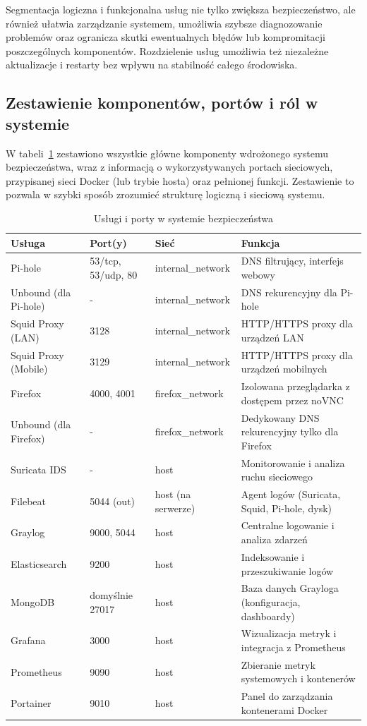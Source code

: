 \documentclass[
    left=2.5cm,         %
    right=2.5cm,        %
    top=2.5cm,          %
    bottom=3cm,         %
    bindingoffset=6mm,  %
    nohyphenation=true %
]{eiti/eiti-thesis} %
\begin{document}
Segmentacja logiczna i funkcjonalna usług nie tylko zwiększa bezpieczeństwo, ale również ułatwia zarządzanie systemem, umożliwia szybsze diagnozowanie problemów oraz ogranicza skutki ewentualnych błędów lub kompromitacji poszczególnych komponentów. Rozdzielenie usług umożliwia też niezależne aktualizacje i restarty bez wpływu na stabilność całego środowiska.

\subsection{Zestawienie komponentów, portów i ról w systemie}

W tabeli~\ref{tab:services-overview} zestawiono wszystkie główne komponenty wdrożonego systemu bezpieczeństwa, wraz z informacją o wykorzystywanych portach sieciowych, przypisanej sieci Docker (lub trybie hosta) oraz pełnionej funkcji. Zestawienie to pozwala w szybki sposób zrozumieć strukturę logiczną i sieciową systemu.

\newpage
\begin{table}[H]
\centering
\caption{Usługi i porty w systemie bezpieczeństwa}
\label{tab:services-overview}
\begin{tabularx}{\textwidth}{|l|l|l|X|}
\hline
\textbf{Usługa} & \textbf{Port(y)} & \textbf{Sieć} & \textbf{Funkcja} \\
\hline
Pi-hole & 53/tcp, 53/udp, 80 & internal\_network & DNS filtrujący, interfejs webowy \\
\hline
Unbound (dla Pi-hole) & - & internal\_network & DNS rekurencyjny dla Pi-hole \\
\hline
Squid Proxy (LAN) & 3128 & internal\_network & HTTP/HTTPS proxy dla urządzeń LAN \\
\hline
Squid Proxy (Mobile) & 3129 & internal\_network & HTTP/HTTPS proxy dla urządzeń mobilnych \\
\hline
Firefox & 4000, 4001 & firefox\_network & Izolowana przeglądarka z dostępem przez noVNC \\
\hline
Unbound (dla Firefox) & - & firefox\_network & Dedykowany DNS rekurencyjny tylko dla Firefox \\
\hline
Suricata IDS & - & host & Monitorowanie i analiza ruchu sieciowego \\
\hline
Filebeat & 5044 (out) & host (na serwerze) & Agent logów (Suricata, Squid, Pi-hole, dysk) \\
\hline
Graylog & 9000, 5044 & host & Centralne logowanie i analiza zdarzeń \\
\hline
Elasticsearch & 9200 & host & Indeksowanie i przeszukiwanie logów \\
\hline
MongoDB & domyślnie 27017 & host & Baza danych Grayloga (konfiguracja, dashboardy) \\
\hline
Grafana & 3000 & host & Wizualizacja metryk i integracja z Prometheus \\
\hline
Prometheus & 9090 & host & Zbieranie metryk systemowych i kontenerów \\
\hline
Portainer & 9010 & host & Panel do zarządzania kontenerami Docker \\
\hline
\end{tabularx}
\end{table}
\end{document}
